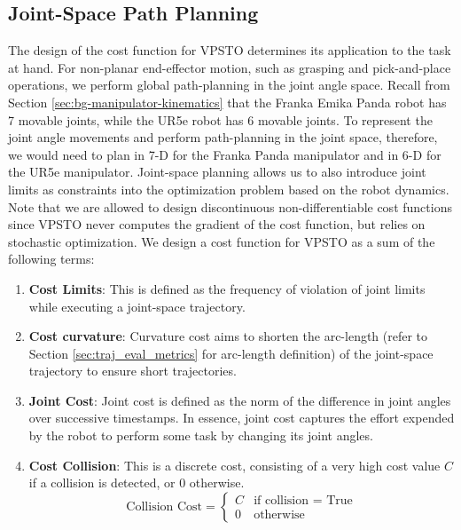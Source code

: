 \subsection{Joint-Space Path Planning}\label{sec:joint-cost}

The design of the cost function for VPSTO determines its application to the task at hand. For non-planar end-effector motion, such as grasping and pick-and-place operations, we perform global path-planning in the joint angle space. Recall from Section \ref{sec:bg-manipulator-kinematics} that the Franka Emika Panda robot has 7 movable joints, while the UR5e robot has 6 movable joints. To represent the joint angle movements and perform path-planning in the joint space, therefore, we would need to plan in 7-D for the Franka Panda manipulator and in 6-D for the UR5e manipulator. Joint-space planning allows us to also introduce joint limits as constraints into the optimization problem based on the robot dynamics. Note that we are allowed to design discontinuous non-differentiable cost functions since VPSTO never computes the gradient of the cost function, but relies on stochastic optimization. We design a cost function for VPSTO as a sum of the following terms:

\begin{enumerate}
    \item \textbf{Cost Limits}: This is defined as the frequency of violation of joint limits while executing a joint-space trajectory. 
    \item \textbf{Cost curvature}: Curvature cost aims to shorten the arc-length (refer to Section \ref{sec:traj_eval_metrics} for arc-length definition) of the joint-space trajectory to ensure short trajectories. 
    \item \textbf{Joint Cost}: Joint cost is defined as the norm of the difference in joint angles over successive timestamps. In essence, joint cost captures the effort expended by the robot to perform some task by changing its joint angles. 
    \item \textbf{Cost Collision}: This is a discrete cost, consisting of a very high cost value $C$ if a collision is detected, or 0 otherwise. 
    \begin{equation}
        \text{Collision Cost} = \begin{cases} 
      C & \text{if collision = True} \\
      0 & \text{otherwise} 
   \end{cases}
    \end{equation}
    
\end{enumerate}

